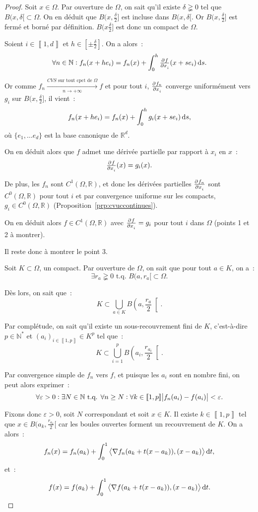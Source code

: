 \documentclass{report}
\theoremstyle{definition}
\theoremstyle{remark}
\newcommand{\R}{\mathbb R}
\newcommand{\N}{\mathbb N}
\newcommand{\tq}{\text{ t.q. }}
\newcommand{\CONV}[5]{\xrightarrow[#2 \to #3]{#4 \text{ #5 } #1}}
\newcommand{\CVSc}[3]{\CONV{#1}{#2}{#3}{CVS}{sur tout cpct de}}
\newcommand{\intint}[2]{\left\llbracket#1, #2\right\rrbracket}
\newcommand{\scpr}[2]{\left\langle #1, #2\right\rangle}
\newcommand{\pinfty}{{+\infty}}
\begin{document}
			\begin{proof} Soit $x \in \Omega$. Par ouverture de $\Omega$, on sait qu'il existe $\delta \gneqq 0$ tel que $B(x, \delta[ \subset \Omega$.
			On en déduit que $B(x, \frac \delta2]$ est incluse dans $B(x, \delta[$. Or $B(x, \frac \delta2]$ est fermé et borné par définition.
			$B(x \frac \delta2]$ est donc un compact de $\Omega$.

			Soient $i \in \intint 1d$ et $h \in [\pm \frac \delta2]$. On a alors~:
			\[\forall n \in \N : f_n(x + he_i) = f_n(x) + \int_0^h\pd f{x_i}(x+s e_i)\dif s.\]

			Or comme $f_n \CVSc \Omega n\pinfty f$ et pour tout $i$, $\pd {f_n}{x_i}$ converge uniformément vers $g_i$ sur $B(x, \frac \delta2]$, il vient~:
			\[f_n(x + he_i) = f_n(x) + \int_0^hg_i(x+se_i)\dif s,\]
			où $\{e_1, \ldots e_d\}$ est la base canonique de $\R^d$.

			On en déduit alors que $f$ admet une dérivée partielle par rapport à $x_i$ en $x$~:
			\[\pd f{x_i}(x) = g_i(x).\]

			De plus, les $f_n$ sont $C^1(\Omega, \R)$, et donc les dérivées partielles $\pd {f_n}{x_i}$ sont $C^0(\Omega, \R)$ pour tout $i$ et par convergence
			uniforme sur les compacts, $g_i \in C^0(\Omega, \R)$ (Proposition~\ref{prp:cvuccontinues}).

			On en déduit alors $f \in C^1(\Omega, \R)$ avec $\pd f{x_i} = g_i$ pour tout $i$ dans $\Omega$ (points 1 et 2 à montrer).

			Il reste donc à montrer le point 3.

			Soit $K \subset \Omega$, un compact. Par ouverture de $\Omega$, on sait que pour tout $a \in K$, on a~:
			\[\exists r_a \gneqq 0 \tq B(a, r_a[ \subset \Omega.\]

			Dès lors, on sait que~:
			\[K \subset \bigcup_{a \in K}B\left(a, \frac {r_a}2\right[.\]

			Par complétude, on sait qu'il existe un sous-recouvrement fini de $K$, c'est-à-dire $p \in \N^*$ et $(a_i)_{i \in \intint 1p} \in K^p$ tel que~:
			\[K \subset \bigcup_{i=1}^pB\left(a_i, \frac {r_{a_i}}2\right[.\]

			Par convergence simple de $f_n$ vers $f$, et puisque les $a_i$ sont en nombre fini, on peut alors exprimer~:
			\[\forall \varepsilon > 0 : \exists N \in \N \tq \forall n \geq N : \forall k \in \intint 1p\abs {f_n(a_i) - f(a_i)} < \varepsilon.\]

			Fixons donc $\varepsilon > 0$, soit $N$ correspondant et soit $x \in K$. Il existe $k \in \intint 1p$ tel que $x \in B(a_k, \frac {r_{a_k}}2[$ car
			les boules ouvertes forment un recouvrement de $K$. On a alors~:
			\[f_n(x) = f_n(a_k) + \int_0^1\scpr {\nabla f_n(a_k + t(x - a_k))}{(x - a_k)}\dif t,\]
			et~:
			\[f(x) = f(a_k) + \int_0^1\scpr {\nabla f(a_k + t(x - a_k))}{(x - a_k)}\dif t.\]


\end{proof}
\end{document}
